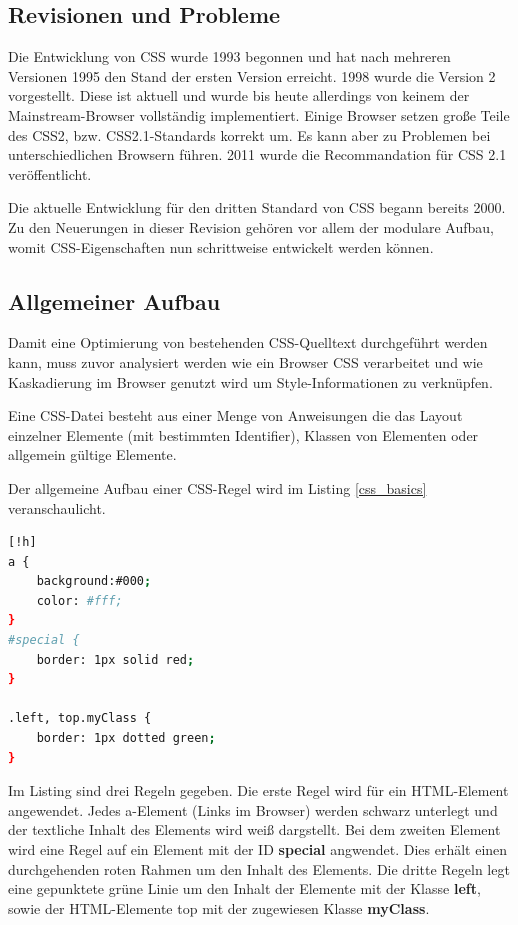 \documentclass[11pt]{scrartcl}
\begin{document}
\subsection{Revisionen und Probleme}
Die Entwicklung von CSS wurde 1993 begonnen und hat nach mehreren Versionen 1995 den Stand der ersten Version erreicht. 1998 wurde die Version 2 vorgestellt. Diese ist aktuell und wurde bis heute allerdings von keinem der Mainstream-Browser vollständig implementiert. Einige Browser setzen große Teile des CSS2, bzw. CSS2.1-Standards korrekt um. Es kann aber zu Problemen bei unterschiedlichen Browsern führen. 2011 wurde die Recommandation für CSS 2.1 veröffentlicht. 

Die aktuelle Entwicklung für den dritten Standard von CSS begann bereits 2000. Zu den Neuerungen in dieser Revision gehören vor allem der modulare Aufbau, womit CSS-Eigenschaften nun schrittweise entwickelt werden können. 

\subsection{Allgemeiner Aufbau}

Damit eine Optimierung von bestehenden CSS-Quelltext durchgeführt werden kann, muss zuvor analysiert werden wie ein Browser CSS verarbeitet und wie Kaskadierung im Browser genutzt wird um Style-Informationen zu verknüpfen.

Eine CSS-Datei besteht aus einer Menge von Anweisungen die das Layout einzelner Elemente (mit bestimmten Identifier), Klassen von Elementen oder allgemein gültige Elemente.

Der allgemeine Aufbau einer CSS-Regel wird im Listing \ref{css_basics} veranschaulicht.   
\begin{lstlisting}[label=css_basics,language=bash, caption=Aufbau einer CSS-Regel][!h]
a {
    background:#000;
    color: #fff;
}  
#special {
    border: 1px solid red;
}

.left, top.myClass {
    border: 1px dotted green;
}
\end{lstlisting}

Im Listing sind drei Regeln gegeben. Die erste Regel wird für ein HTML-Element angewendet. Jedes a-Element (Links im Browser) werden schwarz unterlegt und der textliche Inhalt des Elements wird weiß dargstellt. Bei dem zweiten Element wird eine Regel auf ein Element mit der ID \textbf{special} angwendet. Dies erhält einen durchgehenden roten Rahmen um den Inhalt des Elements. Die dritte Regeln legt eine gepunktete grüne Linie um den Inhalt der Elemente mit der Klasse \textbf{left}, sowie der HTML-Elemente top mit der zugewiesen Klasse \textbf{myClass}.  
\end{document}
